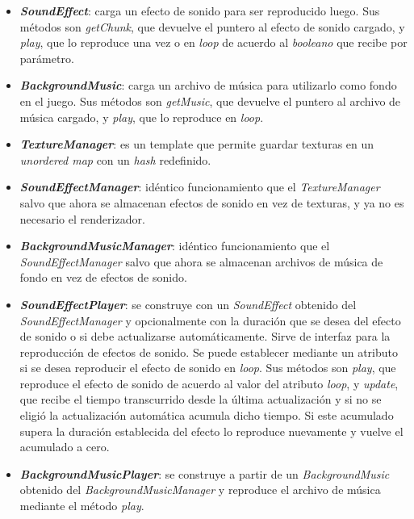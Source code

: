 \begin{itemize}
	\item \textbf{\textit{SoundEffect}}: carga un efecto de sonido para ser reproducido luego. Sus métodos son \textit{getChunk}, que devuelve el puntero al efecto de sonido cargado, y \textit{play}, que lo reproduce una vez o en \textit{loop} de acuerdo al \textit{booleano} que recibe por parámetro.
	
	\item \textbf{\textit{BackgroundMusic}}: carga un archivo de música para utilizarlo como fondo en el juego. Sus métodos son \textit{getMusic}, que devuelve el puntero al archivo de música cargado, y \textit{play}, que lo reproduce en \textit{loop}.
	
	\item \textbf{\textit{TextureManager}}: es un template que permite guardar texturas en un \textit{unordered map} con un \textit{hash} redefinido.
	
	\item \textbf{\textit{SoundEffectManager}}: idéntico funcionamiento que el \textit{TextureManager} salvo que ahora se almacenan efectos de sonido en vez de texturas, y ya no es necesario el renderizador.
	
	\item \textbf{\textit{BackgroundMusicManager}}: idéntico funcionamiento que el \textit{SoundEffectManager} salvo que ahora se almacenan archivos de música de fondo en vez de efectos de sonido.
	
	\item \textbf{\textit{SoundEffectPlayer}}: se construye con un \textit{SoundEffect} obtenido del \textit{SoundEffectManager} y opcionalmente con la duración que se desea del efecto de sonido o si debe actualizarse automáticamente. Sirve de interfaz para la reproducción de efectos de sonido. Se puede establecer mediante un atributo si se desea reproducir el efecto de sonido en \textit{loop}. Sus métodos son \textit{play}, que reproduce el efecto de sonido de acuerdo al valor del atributo \textit{loop}, y \textit{update}, que recibe el tiempo transcurrido desde la última actualización y si no se eligió la actualización automática acumula dicho tiempo. Si este acumulado supera la duración establecida del efecto lo reproduce nuevamente y vuelve el acumulado a cero.
	
	\item \textbf{\textit{BackgroundMusicPlayer}}: se construye a partir de un \textit{BackgroundMusic} obtenido del \textit{BackgroundMusicManager} y reproduce el archivo de música mediante el método \textit{play}.
	

\end{itemize}
